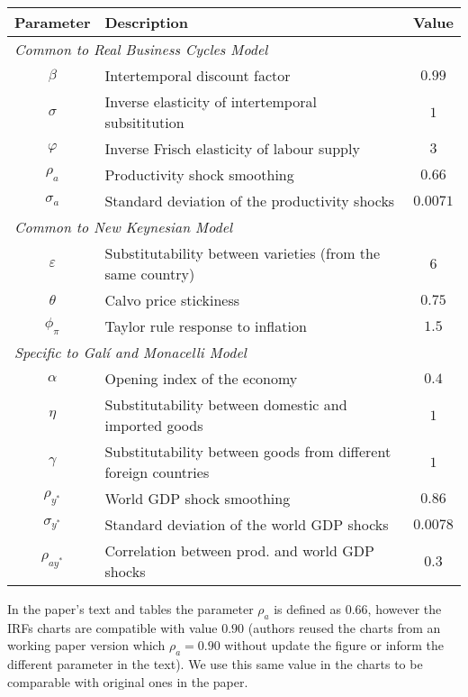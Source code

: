 \documentclass{article}
\begin{document}
\begin{table}[H]
    \centering
    \begin{tabular}{clc}
        \hline
        \textbf{Parameter} & \textbf{Description} & \textbf{Value}\\
        \hline
        \multicolumn{3}{l}{\textit{Common to Real Business Cycles Model}}\\
        $\beta$ & Intertemporal discount factor & $0.99$\\
        $\sigma$ & Inverse elasticity of intertemporal subsititution & $1$\\
        $\varphi$ & Inverse Frisch elasticity of labour supply & $3$\\
        $\rho_a$ & Productivity shock smoothing & $0.66$\\
        $\sigma_a$ & Standard deviation of the productivity shocks & $0.0071$ \\
        \multicolumn{3}{l}{\textit{Common to New Keynesian Model}}\\
        $\varepsilon$ & Substitutability between varieties (from the same country) & $6$\\
        $\theta$ & Calvo price stickiness & $0.75$\\
        $\phi_\pi$ & Taylor rule response to inflation & $1.5$ \\
        \multicolumn{3}{l}{\textit{Specific to Galí and Monacelli Model}}\\
        $\alpha$ & Opening index of the economy  & $0.4$\\
        $\eta$ & Substitutability between domestic and imported goods & $1$\\
        $\gamma$ & Substitutability between goods from different foreign countries & $1$\\
        $\rho_{y^*}$ & World GDP shock smoothing & $0.86$\\
        $\sigma_{y^*}$ & Standard deviation of the world GDP shocks & $0.0078$ \\
        $\rho_{ay^*}$ & Correlation between prod. and world GDP shocks & $0.3$ \\
        \hline
    \end{tabular}
\end{table}

In the paper's text and tables the parameter $\rho_a$ is defined as $0.66$, however the IRFs charts are compatible with value $0.90$ (authors reused the charts from an working paper version which $\rho_a = 0.90$ without update the figure or inform the different parameter in the text). We use this same value in the charts to be comparable with original ones in the paper.
\end{document}
